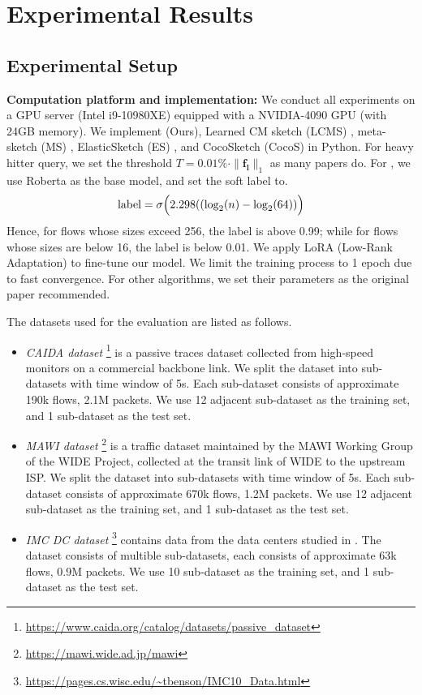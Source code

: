\section{Experimental Results}

\subsection{Experimental Setup}


\textbf{Computation platform and implementation:}
%
We conduct all experiments on a GPU server (Intel i9-10980XE) equipped with a NVIDIA-4090 GPU (with 24GB memory).
%
%
We implement \alg{} (Ours), Learned CM sketch (LCMS) \cite{lcmsketch}, meta-sketch (MS) \cite{metasketch}, ElasticSketch (ES) \cite{elasticsketch}, and CocoSketch (CocoS) \cite{cocosketch} in Python.
%
For heavy hitter query, we set the threshold \(T = 0.01\% \cdot \|\mathbf{f_l}\|_1\) as many papers do.
%
For \alg{}, we use Roberta \cite{roberta} as the base model, and set the soft label to.
%
\[
    \text{label} = \sigma \Bigl(2.298((\log_2(n) - \log_2(64))\Bigr)
\]
%
Hence, for flows whose sizes exceed 256, the label is above 0.99; while for flows whose sizes are below 16, the label is below 0.01.
%
We apply LoRA (Low-Rank Adaptation) \cite{lora} to fine-tune our model. We limit the training process to 1 epoch due to fast convergence.
%
For other algorithms, we set their parameters as the original paper recommended.




 The datasets used for the evaluation are listed as follows.
%
\begin{itemize}[leftmargin=*]
    \item \textit{CAIDA dataset} \footnote{\url{https://www.caida.org/catalog/datasets/passive_dataset}} is a passive traces dataset collected from high-speed monitors on a commercial backbone link.
    We split the dataset into sub-datasets with time window of 5s.
    Each sub-dataset consists of approximate 190k flows, 2.1M packets.
    We use 12 adjacent sub-dataset as the training set, and 1 sub-dataset as the test set.
    \item \textit{MAWI dataset} \footnote{\url{https://mawi.wide.ad.jp/mawi}} is a traffic dataset maintained by the MAWI Working Group of the WIDE Project, collected at the transit link of WIDE to the upstream ISP.
    We split the dataset into sub-datasets with time window of 5s.
    Each sub-dataset consists of approximate 670k flows, 1.2M packets.
    We use 12 adjacent sub-dataset as the training set, and 1 sub-dataset as the test set.
    \item \textit{IMC DC dataset} \footnote{\url{https://pages.cs.wisc.edu/~tbenson/IMC10_Data.html}} contains data from the data centers studied in \cite{imcdc}.
    The dataset consists of multible sub-datasets, each consists of approximate 63k flows, 0.9M packets.
    We use 10 sub-dataset as the training set, and 1 sub-dataset as the test set.
\end{itemize}


